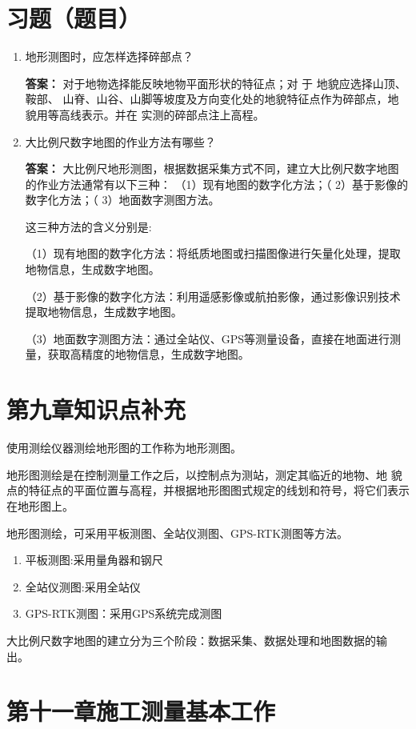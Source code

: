 \documentclass[12pt,a4paper]{article}
\newcounter{question}
\newenvironment{questions}{
    \setcounter{question}{0}
    \section*{习题（题目）}
    \begin{enumerate}[leftmargin=1.5em,label={\arabic*．}]
}{
    \end{enumerate}
}
\newcommand{\answer}[1]{\par\noindent\textbf{答案：} #1\par\vspace{1em}}
\begin{document}
\begin{questions}
    \item 地形测图时，应怎样选择碎部点？
    \answer{对于地物选择能反映地物平面形状的特征点；对 于 地貌应选择山顶、鞍部、
山脊、山谷、山脚等坡度及方向变化处的地貌特征点作为碎部点，地貌用等高线表示。并在
实测的碎部点注上高程。}
    \item 大比例尺数字地图的作业方法有哪些？
    \answer{大比例尺地形测图，根据数据采集方式不同，建立大比例尺数字地图的作业方法通常有以下三种：
（1）现有地图的数字化方法；（ 2）基于影像的数字化方法；（ 3）地面数字测图方法。

这三种方法的含义分别是:

（1）现有地图的数字化方法：将纸质地图或扫描图像进行矢量化处理，提取地物信息，生成数字地图。

（2）基于影像的数字化方法：利用遥感影像或航拍影像，通过影像识别技术提取地物信息，生成数字地图。

（3）地面数字测图方法：通过全站仪、GPS等测量设备，直接在地面进行测量，获取高精度的地物信息，生成数字地图。

}


\end{questions}

\section*{第九章\quad 知识点补充}

使用测绘仪器测绘地形图的工作称为地形测图。 

地形图测绘是在控制测量工作之后，以控制点为测站，测定其临近的地物、地
貌点的特征点的平面位置与高程，并根据地形图图式规定的线划和符号，将它们表示
在地形图上。

地形图测绘，可采用平板测图、全站仪测图、GPS-RTK测图等方法。 

\begin{enumerate}
    \item 平板测图:采用量角器和钢尺
    \item 全站仪测图:采用全站仪
    \item GPS-RTK测图：采用GPS系统完成测图
\end{enumerate}

大比例尺数字地图的建立分为三个阶段：数据采集、数据处理和地图数据的输
出。

\newpage

\section*{第十一章\quad 施工测量基本工作 }
\end{document}
